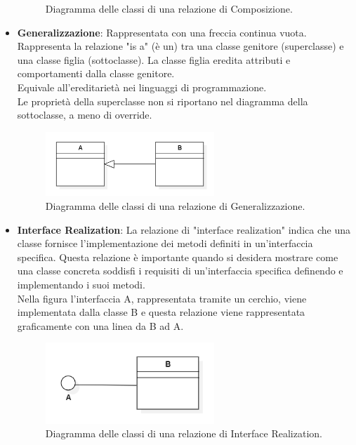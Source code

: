\begin{itemize}
\begin{figure}[H]
        \caption{Diagramma delle classi di una relazione di Composizione.}
    \end{figure}
    \item \textbf{Generalizzazione}: Rappresentata con una freccia continua vuota. Rappresenta la relazione "is a" (è un) tra una classe genitore (superclasse) e una classe figlia (sottoclasse). La classe figlia eredita attributi e comportamenti dalla classe genitore. \\
    Equivale all'ereditarietà nei linguaggi di programmazione. \\
    Le proprietà della superclasse non si riportano nel diagramma della sottoclasse, a meno di override.
    \begin{figure}[H]
        \centering
        \includegraphics[width=0.6\textwidth]{../Images/NormeDiProgetto/ClassDiagram_Generalizzazione.PNG}
        \caption{Diagramma delle classi di una relazione di Generalizzazione.}
    \end{figure}
    \item \textbf{Interface Realization}: La relazione di "interface realization" indica che una classe fornisce l'implementazione dei metodi definiti in un'interfaccia specifica. Questa relazione è importante quando si desidera mostrare come una classe concreta soddisfi i requisiti di un'interfaccia specifica definendo e implementando i suoi metodi. \\
    Nella figura l'interfaccia A, rappresentata tramite un cerchio, viene implementata dalla classe B e questa relazione viene rappresentata graficamente con una linea da B ad A.
    \begin{figure}[H]
        \centering
        \includegraphics[width=0.6\textwidth]{../Images/NormeDiProgetto/InterfaceRealization.PNG}
        \caption{Diagramma delle classi di una relazione di Interface Realization.}
    \end{figure}
\end{itemize}

